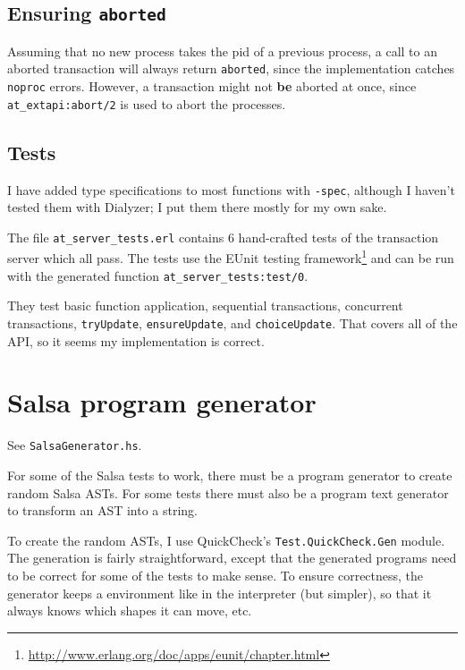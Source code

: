 \documentclass[10pt,a4paper]{article}
\begin{document}
\subsection{Ensuring \texttt{aborted}}

Assuming that no new process takes the pid of a previous process, a call to an
aborted transaction will always return \verb+aborted+, since the implementation
catches \verb+noproc+ errors.  However, a transaction might not \textbf{be}
aborted at once, since \verb+at_extapi:abort/2+ is used to abort the processes.


\subsection{Tests}

I have added type specifications to most functions with \verb+-spec+, although I
haven't tested them with Dialyzer; I put them there mostly for my own sake.

The file \verb+at_server_tests.erl+ contains 6 hand-crafted tests of the
transaction server which all pass.  The tests use the EUnit testing
framework\footnote{\url{http://www.erlang.org/doc/apps/eunit/chapter.html}} and
can be run with the generated function \verb+at_server_tests:test/0+.

They test basic function application, sequential transactions, concurrent
transactions, \verb+tryUpdate+, \verb+ensureUpdate+, and \verb+choiceUpdate+.
That covers all of the API, so it seems my implementation is correct.



\newpage
\section{Salsa program generator}

See \verb+SalsaGenerator.hs+.

For some of the Salsa tests to work, there must be a program generator to create
random Salsa ASTs.  For some tests there must also be a program text generator
to transform an AST into a string.

To create the random ASTs, I use QuickCheck's \verb+Test.QuickCheck.Gen+ module.
The generation is fairly straightforward, except that the generated programs
need to be correct for some of the tests to make sense.  To ensure correctness,
the generator keeps a environment like in the interpreter (but simpler), so that
it always knows which shapes it can move, etc.
\end{document}
